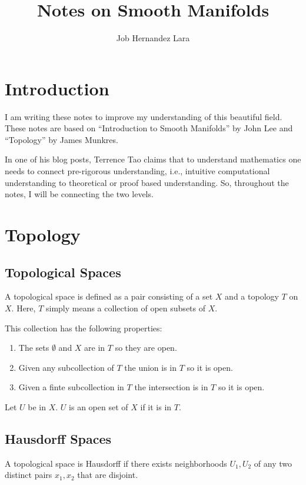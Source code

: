 \documentclass{article}
\title{Notes on Smooth Manifolds}
\author{Job Hernandez Lara}
\date{}
\begin{document}
\maketitle

\section{Introduction}
I am writing these notes to improve my understanding of this beautiful field.
These notes are based on ``Introduction to Smooth Manifolds'' by John Lee and ``Topology'' by James Munkres.

In one of his blog posts, Terrence Tao claims that to understand mathematics one needs to connect pre-rigorous understanding, i.e., intuitive computational understanding to theoretical or proof based understanding. So, throughout the notes, I will be connecting the two levels.

\section{Topology}

\subsection{Topological Spaces}

A topological space is defined as a pair consisting of a set $ X $ and a topology $ T $ on $ X $. Here, $ T $ simply means a collection of open subsets of $ X $.

This collection has the following properties:

\begin{enumerate}
\item The sets $ \emptyset $ and $ X $ are in $ T $ so they are open.
\item Given any subcollection of $ T $ the union is in $ T $ so it is open.
\item Given a finte subcollection in $ T $ the intersection is in $ T $ so it is open.
\end{enumerate}

Let $ U $ be in $ X $. $ U $ is an open set of $ X $ if it is in $ T $.
\subsection{Hausdorff Spaces}
A topological space is Hausdorff if there exists neighborhoods $ U_{1}, U_{2} $ of any two distinct pairs $ x_{1}, x_{2} $ that are disjoint.
\end{document}
